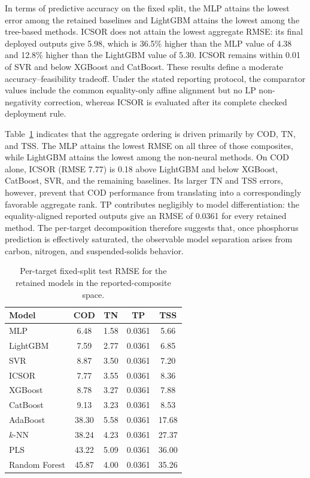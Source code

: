 \documentclass[a4paper,fleqn]{cas-sc}
\DeclareRobustCommand{\currentrev}[1]{{\color{currentRevisionBlue}#1}}
\DeclareRobustCommand{\currentrev}[1]{#1}
\newenvironment{revblock}{}{}
\begin{document}
\begin{revblock}
\currentrev{In terms of predictive accuracy on the fixed split, the MLP attains the lowest error among the retained baselines and LightGBM attains the lowest among the tree-based methods. ICSOR does not attain the lowest aggregate RMSE: its final deployed outputs give 5.98, which is 36.5\% higher than the MLP value of 4.38 and 12.8\% higher than the LightGBM value of 5.30. ICSOR remains within 0.01 of SVR and below XGBoost and CatBoost. These results define a moderate accuracy--feasibility tradeoff.} Under the stated reporting protocol, the comparator values include the common equality-only affine alignment but no LP non-negativity correction, whereas ICSOR is evaluated after its complete checked deployment rule.

Table~\ref{tab:results_target_sample} indicates that the aggregate ordering is driven primarily by COD, TN, and TSS. The MLP attains the lowest RMSE on all three of those composites, while LightGBM attains the lowest among the non-neural methods. On COD alone, ICSOR (RMSE 7.77) is 0.18 above LightGBM and below XGBoost, CatBoost, SVR, and the remaining baselines. Its larger TN and TSS errors, however, prevent that COD performance from translating into a correspondingly favorable aggregate rank. TP contributes negligibly to model differentiation: the equality-aligned reported outputs give an RMSE of 0.0361 for every retained method. The per-target decomposition therefore suggests that, once phosphorus prediction is effectively saturated, the observable model separation arises from carbon, nitrogen, and suspended-solids behavior.

\begin{table}[htbp]
\centering
\caption{Per-target fixed-split test RMSE for the retained models in the reported-composite space.}
\label{tab:results_target_sample}
\scriptsize
\begin{tabular}{lcccc}
\hline
Model & COD & TN & TP & TSS \\
\hline
MLP & 6.48 & 1.58 & 0.0361 & 5.66 \\
LightGBM & 7.59 & 2.77 & 0.0361 & 6.85 \\
SVR & 8.87 & 3.50 & 0.0361 & 7.20 \\
ICSOR & 7.77 & 3.55 & 0.0361 & 8.36 \\
XGBoost & 8.78 & 3.27 & 0.0361 & 7.88 \\
CatBoost & 9.13 & 3.23 & 0.0361 & 8.53 \\
AdaBoost & 38.30 & 5.58 & 0.0361 & 17.68 \\
$k$-NN & 38.24 & 4.23 & 0.0361 & 27.37 \\
PLS & 43.22 & 5.09 & 0.0361 & 36.00 \\
Random Forest & 45.87 & 4.00 & 0.0361 & 35.26 \\
\hline
\end{tabular}
\end{table}


\end{revblock}
\end{document}
